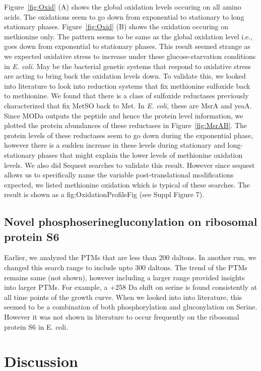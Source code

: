 \documentclass[12pt]{article}
\begin{document}
Figure~\ref{fig:Oxid} (A) shows the global oxidation levels occuring on all amino acids. The oxidations seem to go down from exponential to stationary to long stationary phases. Figure~\ref{fig:Oxid} (B) shows the oxidation occuring on methionine only. The pattern seems to be same as the global oxidation level i.e., goes down from exponential to stationary phases. This result seemed strange as we expected oxidative stress to increase under these glucose-starvation conditions in \emph{E. coli}. May be the bacterial genetic systems that respond to oxidative stress are acting to bring back the oxidation levels down. To validate this, we looked into literature to look into reduction systems that fix methionine sulfoxide back to methionine. We found that there is a class of sulfoxide reductases previously characterized that fix MetSO back to Met. In \emph{E. coli}, these are MsrA and yeaA. Since MODa outputs the peptide and hence the protein level information, we plotted the protein abundances of these reductases in Figure~\ref{fig:MsrAB}. The protein levels of these reductases seem to go down during the exponential phase, however there is a sudden increase in these levels during stationary and long-stationary phases that might explain the lower levels of methionine oxidation levels. We also did Sequest searches to validate this result. However since sequest allows us to specifically name the variable post-translational modifications expected, we listed methionine oxidation which is typical of these searches. The result is shown as a fig:OxidationProfileFig (see Suppl Figure 7).

\subsection{Novel phosphoserinegluconylation on ribosomal protein S6}
Earlier, we analyzed the PTMs that are less than 200 daltons. In another run, we changed this search range to include upto 300 daltons. The trend of the PTMs remains same (not shown), however including a larger range provided insights into larger PTMs. For example, a +258 Da shift on serine is found consistently at all time points of the growth curve. When we looked into into literature, this seemed to be a combination of both phosphorylation and gluconylation on Serine. However it was not shown in literature to occur frequently on the ribosomal protein S6 in E. coli.

\section{Discussion}
\end{document}
